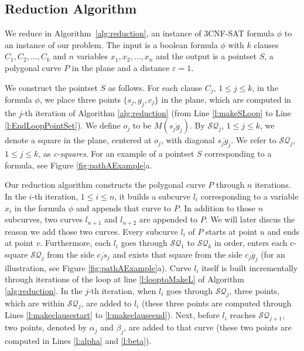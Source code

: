 \documentclass[12pt]{dalthesis}
\newcommand{\eps}{\varepsilon}
\newcommand{\CS}{{\mathscr S}}
\newcommand{\pset}{S}
\newcommand{\gre}{{g}}
\newcommand{\sma}{{s}}
\newcommand{\Seg}[1]{{\overline{#1}}}
\newcommand{\CQ}{{\mathscr Q}}
\newcommand{\sq}{{\CS\CQ}}
\newcommand{\cfev}{{l}}
\begin{document}
\subsection{Reduction Algorithm}

We reduce in Algorithm~\ref{alg:reduction},
an instance of 3CNF-SAT formula $\phi$ 
to an instance of our problem.
The input is a boolean formula 
$\phi$ with $k$ clauses $C_1, C_2, \dots, C_k$ and $n$ variables $x_1, x_2, \dots,x_n$ 
and the output is a pointset $\pset$,
a polygonal curve $P$ in the plane and 
a distance $\eps = 1$.


We construct the pointset $S$ as follows.
For each clause $C_j$, $1 \le j \le k$, in the formula $\phi$, 
we place three points $\{s_j, g_j,c_j\}$ in the plane, which are computed
in the $j$-th iteration of Algorithm \ref{alg:reduction} (from Line \ref{l:makeSLoop} to Line \ref{l:EndLoopPointSet}).
We define $o_j$ to be $M(\Seg{\sma_j\gre_j})$.
By $\sq_j$, $1\le j \le k$, we denote
a square in the plane, centered at $o_j$, 
with diagonal $\Seg{\sma_j \gre_j}$. 
We refer to $\sq_j$, $1\le j \le k$, as
{\em c-squares}. 
For an example of a pointset $S$ corresponding to a formula, 
see Figure \ref{fig:pathAExample}a.


Our reduction algorithm constructs the polygonal curve $P$ 
through $n$ iterations. In  the $i$-th iteration, $1 \le i \le n$,
it builds a subcurve $\cfev_i$ corresponding to  a variable 
$x_i$ in the formula $\phi$ and appends that curve to $P$.
In addition to those $n$ subcurves, two curves 
$\cfev_{n+1}$ and $\cfev_{n+2}$ are appended to $P$. 
We will later discus the reason we add those 
two curves. Every subcurve  $\cfev_i$ of $P$ starts at point $u$ 
and ends at point $v$.
Furthermore, each  $\cfev_i$ goes through
$\sq_1$ to $\sq_k$ in order, enters each c-square $\sq_j$ from
the side $\Seg{c_j s_j}$  and exists that square from 
the side $\Seg{c_j g_j}$  (for an illustration, see Figure \ref{fig:pathAExample}a). 
Curve $\cfev_i$ itself is built incrementally  
through iterations of the loop at line \ref{l:looptoMakeL} 
of Algorithm \ref{alg:reduction}. 
In the $j$-th iteration, when $\cfev_i$ goes through $\sq_j$,
three points, which are within  $\sq_j$, are added to  $\cfev_i$
(these three points are computed through Lines 
\ref{l:makeclausestart} to \ref{l:makeclauseend}).
Next, before $\cfev_i$ reaches  $\sq_{j+1}$,
two points,  denoted by $\alpha_j$ and $\beta_j$, are added to that curve 
(these two points are computed in Lines \ref{l:alpha} 
and \ref{l:beta}).
\end{document}
